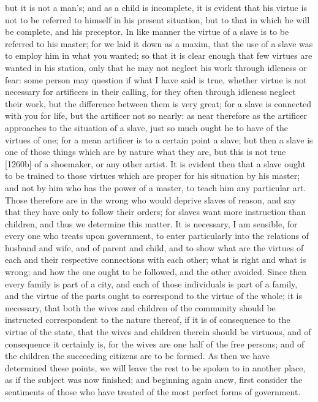 but it is not a man's; and as a child is incomplete, it is evident that
his virtue is not to be referred to himself in his present situation, but
to that in which he will be complete, and his preceptor. In like manner
the virtue of a slave is to be referred to his master; for we laid it down
as a maxim, that the use of a slave was to employ him in what you wanted;
so that it is clear enough that few virtues are wanted in his station,
only that he may not neglect his work through idleness or fear: some
person may question if what I have said is true, whether virtue is not
necessary for artificers in their calling, for they often through idleness
neglect their work, but the difference between them is very great; for a
slave is connected with you for life, but the artificer not so nearly: as
near therefore as the artificer approaches to the situation of a slave,
just so much ought he to have of the virtues of one; for a mean artificer
is to a certain point a slave; but then a slave is one of those things
which are by nature what they are, but this is not true [1260b] of a
shoemaker, or any other artist. It is evident then that a slave ought to
be trained to those virtues which are proper for his situation by his
master; and not by him who has the power of a master, to teach him any
particular art. Those therefore are in the wrong who would deprive slaves
of reason, and say that they have only to follow their orders; for slaves
want more instruction than children, and thus we determine this matter. It
is necessary, I am sensible, for every one who treats upon government, to
enter particularly into the relations of husband and wife, and of parent
and child, and to show what are the virtues of each and their respective
connections with each other; what is right and what is wrong; and how the
one ought to be followed, and the other avoided. Since then every family
is part of a city, and each of those individuals is part of a family, and
the virtue of the parts ought to correspond to the virtue of the whole; it
is necessary, that both the wives and children of the community should be
instructed correspondent to the nature thereof, if it is of consequence to
the virtue of the state, that the wives and children therein should be
virtuous, and of consequence it certainly is, for the wives are one half
of the free persons; and of the children the succeeding citizens are to be
formed. As then we have determined these points, we will leave the rest to
be spoken to in another place, as if the subject was now finished; and
beginning again anew, first consider the sentiments of those who have
treated of the most perfect forms of government.

